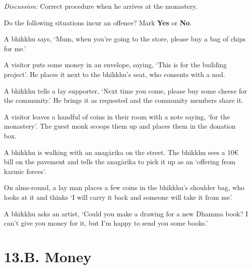 \begin{exam}{\autoExamName}
    \emph{Discussion:} Correct procedure when he arrives at the monastery.

  \problemDivide

  \begin{problem*}

    Do the following situations incur an offence? Mark \textbf{Yes} or \textbf{No}.

    \bigskip

    \begin{parts}

    \item {} A bhikkhu says, `Mum, when you're going to the store, please
    buy a bag of chips for me.'

    \bigskip

    \item {} A visitor puts some money in an envelope, saying, `This is for
      the building project'. He places it next to the bhikkhu's seat, who
      consents with a nod.

    \bigskip

    \item {} A bhikkhu tells a lay supporter, `Next time you come, please
      buy some cheese for the community.' He brings it as requested and the
      community members share it.

    \bigskip

    \item {} A visitor leaves a handful of coins in their room with a note saying, `for the monastery'.
      The guest monk scoops them up and places them in the donation box.

    \bigskip

    \item {} A bhikkhu is walking with an anagārika on the street. The
      bhikkhu sees a 10€ bill on the pavement and tells the anagārika to pick it
      up as an `offering from karmic forces'.

    \bigskip

    \item {} On alms-round, a lay man places a few coins in the bhikkhu's
      shoulder bag, who looks at it and thinks `I will carry it back and someone
      will take it from me'.

    \bigskip

    \item {} A bhikkhu asks an artist, `Could you make a drawing for a new
      Dhamma book? I can't give you money for it, but I'm happy to send you some
      books.'

    \end{parts}
    
  \end{problem*}

\end{exam}

\chapter{13.B. Money}
\renewcommand*{\theChapterTitle}{13.B. Money}
